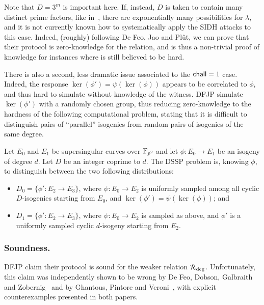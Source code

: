 Note that $D = 3^m$ is important here.
If, instead, $D$ is taken to contain many distinct prime factors, like in~\cite{cryptoeprint:2022/1019,cryptoeprint:2022/1054}, there are exponentially many possibilities for $\lambda$, and it is not currently known how to systematically apply the SIDH attacks to this case.
Indeed, (roughly) following De Feo, Jao and Plût, we can prove that their protocol is zero-knowledge for the \R[M-SIDH] relation, and is thus a non-trivial proof of knowledge for instances where \R[M-SIDH] is still believed to be hard.

There is also a second, less dramatic issue associated to the $\chall = 1$ case.
Indeed, the response $\ker(\phi') = \psi(\ker(\phi))$ appears to be correlated to $\phi$, and thus hard to simulate without knowledge of the witness.
DFJP simulate $\ker(\phi')$ with a randomly chosen group, thus reducing zero-knowledge to the hardness of the following computational problem, stating that it is difficult to distinguish pairs of ``parallel'' isogenies from random pairs of isogenies of the same degree.

\begin{definition}\label{defn:DSSP}
    Let $E_0$ and $E_1$ be supersingular curves over $\F_{p^2}$ and let $\phi :E_0 \to E_1$ be an isogeny of degree $d$.
    Let $D$ be an integer coprime to $d$.
    The DSSP problem is, knowing $\phi$, to distinguish between the two following distributions:
    \begin{itemize}
        \item $D_0 = \{ \phi' : E_2 \to E_3 \}$, where $\psi : E_0 \to E_2$ is uniformly sampled among all cyclic $D$-isogenies starting from $E_0$, and $\ker(\phi') = \psi(\ker(\phi))$; and
        \item $D_1 = \{ \phi' : E_2 \to E_3 \}$, where $\psi : E_0 \to E_2$ is sampled as above, and $\phi'$ is a uniformly sampled cyclic $d$-isogeny starting from $E_2$.
    \end{itemize}
\end{definition}


\subsubsection{Soundness.}
DFJP claim their protocol is sound for the weaker relation $\R[deg]$.
Unfortunately, this claim was independently shown to be wrong by De Feo, Dobson, Galbraith and Zobernig~\cite{DFDGZ21} and by Ghantous, Pintore and Veroni~\cite{GPV21}, with explicit counterexamples presented in both papers.

